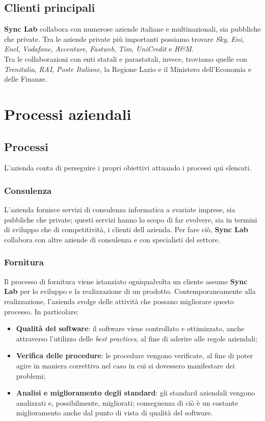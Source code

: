 \subsection*{Clienti principali}
\textbf{Sync Lab} collabora con numerose aziende italiane e multinazionali, sia pubbliche che private. Tra le aziende private più importanti possiamo trovare \textit{Sky}, \textit{Eni}, \textit{Enel}, \textit{Vodafone}, \textit{Accenture}, \textit{Fastweb}, \textit{Tim}, \textit{UniCredit} e \textit{H\&M}. \\
Tra le collaborazioni con enti statali e parastatali, invece, troviamo quelle con \textit{Trenitalia}, \textit{RAI}, \textit{Poste Italiane}, la Regione Lazio e il Ministero dell'Economia e delle Finanze.

\section{Processi aziendali}

\subsection{Processi}

L'azienda conta di perseguire i propri obiettivi attuando i processi qui elencati.

\subsubsection*{Consulenza}

L'azienda fornisce servizi di consulenza informatica a svariate imprese, sia pubbliche che private; questi servizi hanno lo scopo di far evolvere, sia in termini di sviluppo che di competitività, i clienti dell azienda. Per fare ciò, \textbf{Sync Lab} collabora con altre aziende di consulenza e con specialisti del settore.

\subsubsection*{Fornitura}

Il processo di fornitura viene istanziato ogniqualvolta un cliente assume \textbf{Sync Lab} per lo sviluppo e la realizzazione di un prodotto. Contemporaneamente alla realizzazione, l'azienda svolge delle attività che possano migliorare questo processo. In particolare:
\begin{itemize}
  \item \textbf{Qualità del software}: il software viene controllato e ottimizzato, anche attraverso l'utilizzo delle \textit{best practices}, al fine di aderire alle regole aziendali;
  \item \textbf{Verifica delle procedure}: le procedure vengono verificate, al fine di poter agire in maniera correttiva nel caso in cui si dovessero manifestare dei problemi;
  \item \textbf{Analisi e miglioramento degli standard}: gli standard aziendali vengono analizzati e, possibilmente, migliorati; conseguenza di ciò è un costante miglioramento anche dal punto di vista di qualità del software.
\end{itemize}

